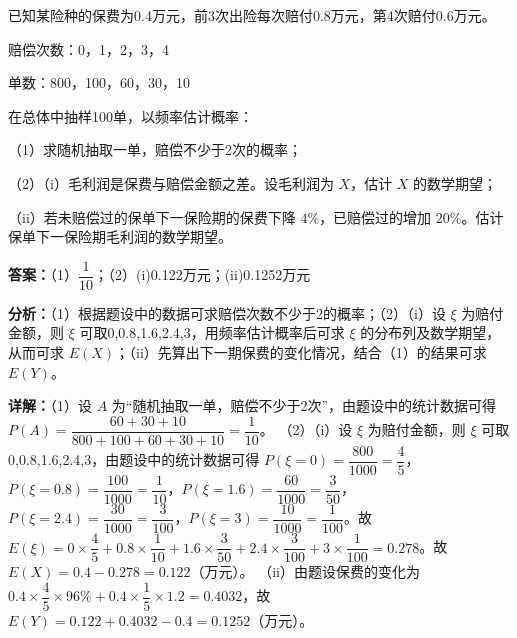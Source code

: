 \begin{question}[points=14]
已知某险种的保费为0.4万元，前3次出险每次赔付0.8万元，第4次赔付0.6万元。

赔偿次数：0，1，2，3，4

单数：800，100，60，30，10

在总体中抽样100单，以频率估计概率：

（1）求随机抽取一单，赔偿不少于2次的概率；

（2）（i）毛利润是保费与赔偿金额之差。设毛利润为 $X$，估计 $X$ 的数学期望；

（ii）若未赔偿过的保单下一保险期的保费下降 $4\%$，已赔偿过的增加 $20\%$。估计保单下一保险期毛利润的数学期望。
\begin{solution}
\textbf{答案：}（1）$\dfrac{1}{10}$；（2）(i)0.122万元；(ii)0.1252万元

\textbf{分析：}（1）根据题设中的数据可求赔偿次数不少于2的概率；（2）（i）设 $\xi$ 为赔付金额，则 $\xi$ 可取0,0.8,1.6,2.4,3，用频率估计概率后可求 $\xi$ 的分布列及数学期望，从而可求 $E(X)$；（ii）先算出下一期保费的变化情况，结合（1）的结果可求 $E(Y)$。

\textbf{详解：}（1）设 $A$ 为“随机抽取一单，赔偿不少于2次”，由题设中的统计数据可得 $P(A) = \dfrac{60+30+10}{800+100+60+30+10} = \dfrac{1}{10}$。
（2）（i）设 $\xi$ 为赔付金额，则 $\xi$ 可取0,0.8,1.6,2.4,3，由题设中的统计数据可得 $P(\xi=0)=\dfrac{800}{1000}=\dfrac{4}{5}$，$P(\xi=0.8)=\dfrac{100}{1000}=\dfrac{1}{10}$，$P(\xi=1.6)=\dfrac{60}{1000}=\dfrac{3}{50}$，$P(\xi=2.4)=\dfrac{30}{1000}=\dfrac{3}{100}$，$P(\xi=3)=\dfrac{10}{1000}=\dfrac{1}{100}$。故 $E(\xi)=0\times\dfrac{4}{5}+0.8\times\dfrac{1}{10}+1.6\times\dfrac{3}{50}+2.4\times\dfrac{3}{100}+3\times\dfrac{1}{100}=0.278$。故 $E(X)=0.4-0.278=0.122$（万元）。
（ii）由题设保费的变化为 $0.4\times\dfrac{4}{5}\times96\% + 0.4\times\dfrac{1}{5}\times1.2 = 0.4032$，故 $E(Y)=0.122+0.4032-0.4=0.1252$（万元）。
\end{solution}
\end{question}

